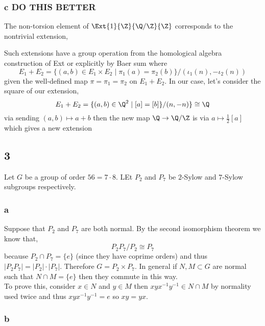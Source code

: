 \documentclass[12pt]{article}
\begin{document}
\subsubsection{c DO THIS BETTER}

The non-torsion element of $\Ext{1}{\Z}{\Q / \Z}{\Z}$ corresponds to the nontrivial extension,
\begin{center}
\end{center}
Such extensions have a group operation from the homological algebra construction of Ext or explicitly by Baer sum where 
\[ E_1 + E_2 = \{ (a,b) \in E_1 \times E_2 \mid \pi_1(a) = \pi_2(b) \} / (\iota_1(n), - \iota_2(n)) \]
given the well-defined map $\pi = \pi_1 = \pi_2$ on $E_1 + E_2$. In our case, let's consider the square of our extension,
\[ E_1 + E_2 = \{ (a,b) \in \Q^2 \mid [a] = [b] \} / (n, -n) \} \cong \Q \]
via sending $(a,b) \mapsto a + b$ then the new map $\Q \to \Q / \Z$ is via $a \mapsto \tfrac{1}{2} [a]$ which gives a new extension

\subsection{3}

Let $G$ be a group of order $56 = 7 \cdot 8$. LEt $P_2$ and $P_7$ be $2$-Sylow and $7$-Sylow subgroups respectively.

\subsubsection{a}

Suppose that $P_2$ and $P_7$ are both normal. By the second isomorphism theorem we know that,
\[ P_2 P_7 / P_2 \cong P_7 \]
because $P_2 \cap P_7 = \{ e \}$ (since they have coprime orders) and thus $|P_2 P_7| = |P_2| \cdot |P_7|$. Therefore $G = P_2 \times P_7$. In general if $N,M \subset G$ are normal such that $N\cap M = \{ e \}$ then they commute in this way. 
\bigskip\\
To prove this, consider $x \in N$ and $y \in M$ then $xyx^{-1} y^{-1} \in N \cap M$ by normality used twice and thus $xyx^{-1} y^{-1} = e$ so $xy = yx$.

\subsubsection{b}
\end{document}

